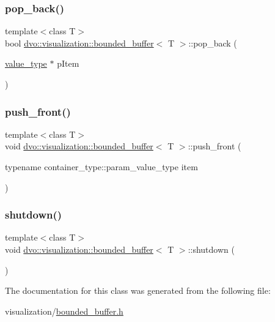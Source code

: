\subsubsection{\texorpdfstring{pop\+\_\+back()}{pop\_back()}}
{\footnotesize\ttfamily template$<$class T$>$ \\
bool \mbox{\hyperlink{classdvo_1_1visualization_1_1bounded__buffer}{dvo\+::visualization\+::bounded\+\_\+buffer}}$<$ T $>$\+::pop\+\_\+back (\begin{DoxyParamCaption}\item[{\mbox{\hyperlink{classdvo_1_1visualization_1_1bounded__buffer_a69f22957276557660f1bf8b654e3a667}{value\+\_\+type}} $\ast$}]{p\+Item }\end{DoxyParamCaption})\hspace{0.3cm}{\ttfamily [inline]}}

\mbox{\label{classdvo_1_1visualization_1_1bounded__buffer_a2b72854b9be8a3c4831f9f46d2c4a549}} 
\subsubsection{\texorpdfstring{push\+\_\+front()}{push\_front()}}
{\footnotesize\ttfamily template$<$class T$>$ \\
void \mbox{\hyperlink{classdvo_1_1visualization_1_1bounded__buffer}{dvo\+::visualization\+::bounded\+\_\+buffer}}$<$ T $>$\+::push\+\_\+front (\begin{DoxyParamCaption}\item[{typename container\+\_\+type\+::param\+\_\+value\+\_\+type}]{item }\end{DoxyParamCaption})\hspace{0.3cm}{\ttfamily [inline]}}

\mbox{\label{classdvo_1_1visualization_1_1bounded__buffer_ae4afdb9c626f4f38cbc34b81fdfa8bf7}} 
\subsubsection{\texorpdfstring{shutdown()}{shutdown()}}
{\footnotesize\ttfamily template$<$class T$>$ \\
void \mbox{\hyperlink{classdvo_1_1visualization_1_1bounded__buffer}{dvo\+::visualization\+::bounded\+\_\+buffer}}$<$ T $>$\+::shutdown (\begin{DoxyParamCaption}{ }\end{DoxyParamCaption})\hspace{0.3cm}{\ttfamily [inline]}}



The documentation for this class was generated from the following file\+:\begin{DoxyCompactItemize}
\item 
visualization/\mbox{\hyperlink{bounded__buffer_8h}{bounded\+\_\+buffer.\+h}}\end{DoxyCompactItemize}
